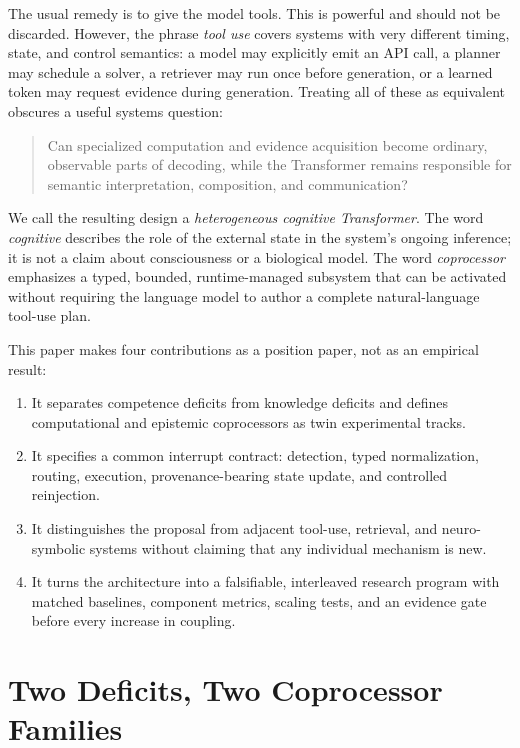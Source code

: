 \documentclass[11pt]{article}
\begin{document}
The usual remedy is to give the model tools.  This is powerful and should not
be discarded.  However, the phrase \emph{tool use} covers systems with very
different timing, state, and control semantics: a model may explicitly emit an
API call, a planner may schedule a solver, a retriever may run once before
generation, or a learned token may request evidence during generation.  Treating
all of these as equivalent obscures a useful systems question:

\begin{quote}
Can specialized computation and evidence acquisition become ordinary,
observable parts of decoding, while the Transformer remains responsible for
semantic interpretation, composition, and communication?
\end{quote}

We call the resulting design a \emph{heterogeneous cognitive Transformer}.
The word \emph{cognitive} describes the role of the external state in the
system's ongoing inference; it is not a claim about consciousness or a
biological model.  The word \emph{coprocessor} emphasizes a typed, bounded,
runtime-managed subsystem that can be activated without requiring the language
model to author a complete natural-language tool-use plan.

This paper makes four contributions as a position paper, not as an empirical
result:
\begin{enumerate}
  \item It separates competence deficits from knowledge deficits and defines
  computational and epistemic coprocessors as twin experimental tracks.
  \item It specifies a common interrupt contract: detection, typed
  normalization, routing, execution, provenance-bearing state update, and
  controlled reinjection.
  \item It distinguishes the proposal from adjacent tool-use, retrieval, and
  neuro-symbolic systems without claiming that any individual mechanism is new.
  \item It turns the architecture into a falsifiable, interleaved research
  program with matched baselines, component metrics, scaling tests, and an
  evidence gate before every increase in coupling.
\end{enumerate}

\section{Two Deficits, Two Coprocessor Families}
\end{document}
